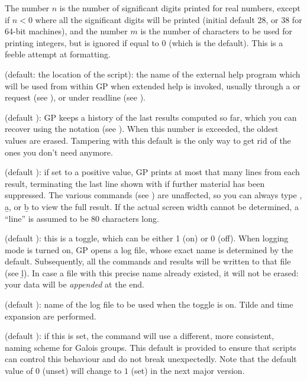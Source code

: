 The number $n$ is the number of significant digits printed for real
numbers, except if $n<0$ where all the significant digits will be printed
(initial default 28, or 38 for 64-bit machines), and the number $m$ is the
number of characters to be used for printing integers, but is ignored if
equal to 0 (which is the default). This is a feeble attempt at formatting.

 (default: the location of the  script): the
name of the external help program which will be used from within GP when
extended help is invoked, usually through a  or  request
(see ), or  under readline (see
).

 (default ): GP keeps a history of the last
 results computed so far, which you can recover using the
\kbd{\%} notation (see ). When this number is exceeded,
the oldest values are erased. Tampering with this default is the only way to
get rid of the ones you don't need anymore.

 (default ): if set to a positive value, GP prints at
most that many lines from each result, terminating the last line shown with
\kbd{[+++]} if further material has been suppressed. The various 
commands (see ) are unaffected, so you can always type
, \b{a}, or \b{b} to view the full result. If the actual
screen width cannot be determined, a ``line'' is assumed to be 80 characters
long.

 (default ): this is a toggle, which can be either 1
(on) or 0 (off). When logging mode is turned on, GP opens a log file, whose
exact name is determined by the  default. Subsequently, all the
commands and results will be written to that file (see \b{l}). In case a file
with this precise name already existed, it will not be erased: your data will
be \emph{appended} at the end.

 (default ): name of the log file to be
used when the  toggle is on. Tilde and time expansion are performed.

 (default ): if this is set, the
 command will use a different, more consistent, naming scheme
for Galois groups. This default is provided to ensure that scripts
can control this behaviour and do not break unexpectedly. Note that the
default value of $0$ (unset) will change to $1$ (set) in the next major
version.


